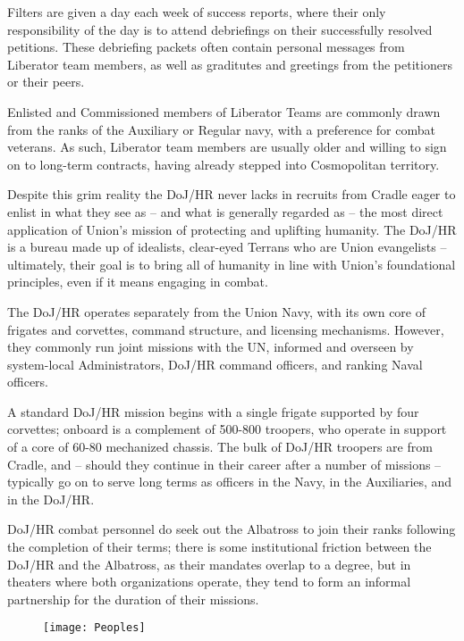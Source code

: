 Filters are given a day each week of success reports, where their only responsibility of the day is
to attend debriefings on their successfully resolved petitions. These debriefing packets often
contain personal messages from Liberator team members, as well as graditutes and greetings
from the petitioners or their peers.

Enlisted and Commissioned members of Liberator Teams are commonly drawn from the ranks of
the Auxiliary or Regular navy, with a preference for combat veterans. As such, Liberator team
members are usually older and willing to sign on to long-term contracts, having already stepped
into Cosmopolitan territory.

Despite this grim reality the DoJ/HR never lacks in recruits from Cradle eager to enlist in what
they see as -- and what is generally regarded as -- the most direct application of Union’s mission
of protecting and uplifting humanity. The DoJ/HR is a bureau made up of idealists, clear-eyed
Terrans who are Union evangelists -- ultimately, their goal is to bring all of humanity in line with
Union’s foundational principles, even if it means engaging in combat.

The DoJ/HR operates separately from the Union Navy, with its own core of frigates and corvettes,
command structure, and licensing mechanisms. However, they commonly run joint missions with
the UN, informed and overseen by system-local Administrators, DoJ/HR command officers, and
ranking Naval officers.

A standard DoJ/HR mission begins with a single frigate supported by four corvettes; onboard is a
complement of 500-800 troopers, who operate in support of a core of 60-80 mechanized chassis.
The bulk of DoJ/HR troopers are from Cradle, and -- should they continue in their career after a
number of missions -- typically go on to serve long terms as officers in the Navy, in the Auxiliaries,
and in the DoJ/HR.

DoJ/HR combat personnel do seek out the Albatross to join their ranks following the completion of
their terms; there is some institutional friction between the DoJ/HR and the Albatross, as their
mandates overlap to a degree, but in theaters where both organizations operate, they tend to form
an informal partnership for the duration of their missions.

\begin{figure}\begin{center}
  \texttt{[image: Peoples]}
\end{center}\end{figure}
